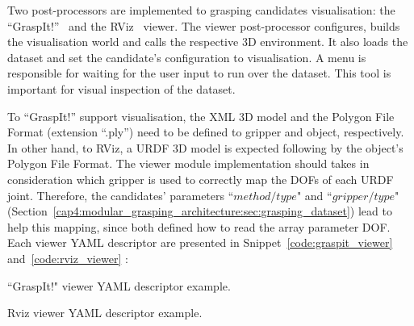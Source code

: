Two post-processors are implemented to grasping candidates visualisation: the ``GraspIt!''~\cite{miller2004graspit} and the RViz~\cite{rviz} viewer. The viewer post-processor configures, builds the visualisation world and calls the respective 3D environment. It also loads the dataset and set the candidate's configuration to visualisation. A menu is responsible for waiting for the user input to run over the dataset. This tool is important for visual inspection of the dataset.

To ``GraspIt!'' support visualisation, the XML 3D model and the Polygon File Format (extension ``.ply'') need to be defined to gripper and object, respectively. In other hand, to RViz, a URDF 3D model is expected following by the object's Polygon File Format. The viewer module implementation should takes in consideration which gripper is used to correctly map the DOFs of each URDF joint. Therefore, the candidates' parameters ``$method/type$" and ``$gripper/type$"  (Section~\ref{cap4:modular_grasping_architecture:sec:grasping_dataset}) lead to help this mapping, since both defined how to read the array parameter \ac{DOF}. Each viewer YAML descriptor are presented in Snippet~\ref{code:graspit_viewer} and~\ref{code:rviz_viewer} : 

\begin{snippet}[h!]
\centering
{}
\caption{``GraspIt!" viewer YAML descriptor example.}
\label{code:graspit_viewer}
\end{snippet}

\begin{snippet}[h!]
\centering
{}
\caption{Rviz viewer YAML descriptor example.}
\label{code:rviz_viewer}
\end{snippet}

